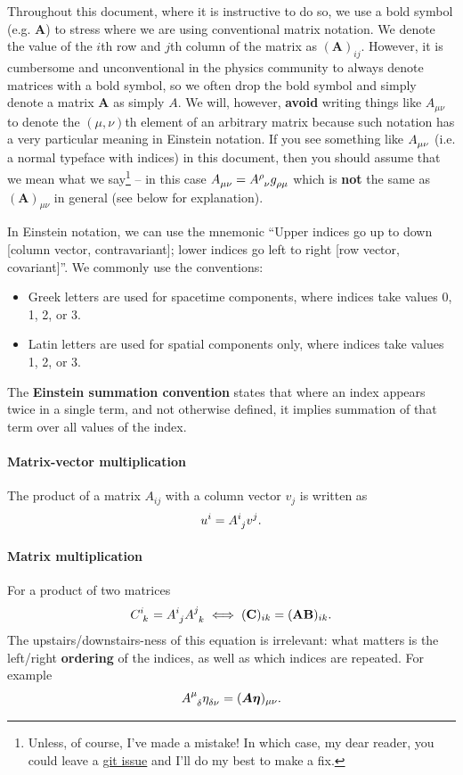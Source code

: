 \documentclass[11pt]{article}
\numberwithin{equation}{section}
\newcommand{\bs}{\boldsymbol}
\begin{document}
Throughout this document, where it is instructive to do so, we use a bold symbol (e.g. $\bs{A}$) to stress where we are using conventional matrix notation. We denote the value of the $i$th row and $j$th column of the matrix as $(\bs{A})_{ij}$. However, it is cumbersome and unconventional in the physics community to always denote matrices with a bold symbol, so we often drop the bold symbol and simply denote a matrix $\bs{A}$ as simply $A$. We will, however, \textbf{avoid} writing things like $A_{\mu \nu}$ to denote the $(\mu, \nu)$th element of an arbitrary matrix because such notation has a very particular meaning in Einstein notation. If you see something like $\tensor{A}{_\mu _\nu}$ (i.e. a normal typeface with indices) in this document, then you should assume that we mean what we say\footnote{Unless, of course, I've made a mistake! In which case, my dear reader, you could leave a \href{https://github.com/jaryaman/physics-from-symmetry-notes/issues}{git issue} and I'll do my best to make a fix.} -- in this case $\tensor{A}{_\mu_\nu} = \tensor{A}{^\rho_\nu} \tensor{g}{_\rho_\mu}$ which is \textbf{not} the same as $(\bs{A})_{\mu \nu}$ in general (see below for explanation).

In Einstein notation, we can use the mnemonic ``Upper indices go up to down [column vector, contravariant]; lower indices go left to right [row vector, covariant]''. We commonly use the conventions:
\begin{itemize}
\item Greek letters are used for spacetime components, where indices take values 0, 1, 2, or 3.
\item Latin letters are used for spatial components only, where indices take values 1, 2, or 3.
\end{itemize}
The \textbf{Einstein summation convention} states that where an index appears twice in a single term, and not otherwise defined, it implies summation of that term over all values of the index.

\paragraph{Matrix-vector multiplication} The product of a matrix $A_{ij}$ with a column vector $v_j$ is written as 
\begin{equation}
u^i = \tensor{A}{^i_j} v^j.
\end{equation} 

\paragraph{Matrix multiplication} For a product of two matrices 
\begin{equation}
\tensor{C}{^i_k} = \tensor{A}{^i_j} \tensor{A}{^j_k}  \iff  (\textbf{C})_{ik} = (\textbf{AB})_{ik}.
\end{equation}
The upstairs/downstairs-ness of this equation is irrelevant: what matters is the left/right \textbf{ordering} of the indices, as well as which indices are repeated. For example
\begin{equation}
\tensor{A}{^\mu_\delta} \tensor{\eta}{_\delta _\nu} = (\boldsymbol{A \eta})_{\mu\nu}.
\end{equation}
\end{document}
